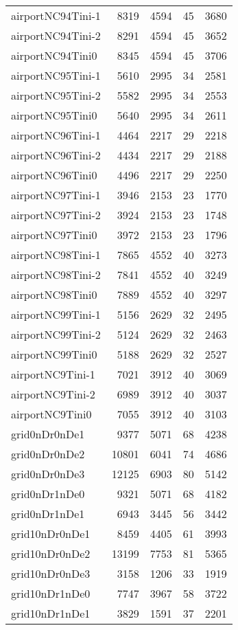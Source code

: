 \begin{longtable}{lrrrr}
airportNC94Tini-1 & 8319 & 4594 & 45 & 3680 \\
airportNC94Tini-2 & 8291 & 4594 & 45 & 3652 \\
airportNC94Tini0 & 8345 & 4594 & 45 & 3706 \\
airportNC95Tini-1 & 5610 & 2995 & 34 & 2581 \\
airportNC95Tini-2 & 5582 & 2995 & 34 & 2553 \\
airportNC95Tini0 & 5640 & 2995 & 34 & 2611 \\
airportNC96Tini-1 & 4464 & 2217 & 29 & 2218 \\
airportNC96Tini-2 & 4434 & 2217 & 29 & 2188 \\
airportNC96Tini0 & 4496 & 2217 & 29 & 2250 \\
airportNC97Tini-1 & 3946 & 2153 & 23 & 1770 \\
airportNC97Tini-2 & 3924 & 2153 & 23 & 1748 \\
airportNC97Tini0 & 3972 & 2153 & 23 & 1796 \\
airportNC98Tini-1 & 7865 & 4552 & 40 & 3273 \\
airportNC98Tini-2 & 7841 & 4552 & 40 & 3249 \\
airportNC98Tini0 & 7889 & 4552 & 40 & 3297 \\
airportNC99Tini-1 & 5156 & 2629 & 32 & 2495 \\
airportNC99Tini-2 & 5124 & 2629 & 32 & 2463 \\
airportNC99Tini0 & 5188 & 2629 & 32 & 2527 \\
airportNC9Tini-1 & 7021 & 3912 & 40 & 3069 \\
airportNC9Tini-2 & 6989 & 3912 & 40 & 3037 \\
airportNC9Tini0 & 7055 & 3912 & 40 & 3103 \\
grid0nDr0nDe1 & 9377 & 5071 & 68 & 4238 \\
grid0nDr0nDe2 & 10801 & 6041 & 74 & 4686 \\
grid0nDr0nDe3 & 12125 & 6903 & 80 & 5142 \\
grid0nDr1nDe0 & 9321 & 5071 & 68 & 4182 \\
grid0nDr1nDe1 & 6943 & 3445 & 56 & 3442 \\
grid10nDr0nDe1 & 8459 & 4405 & 61 & 3993 \\
grid10nDr0nDe2 & 13199 & 7753 & 81 & 5365 \\
grid10nDr0nDe3 & 3158 & 1206 & 33 & 1919 \\
grid10nDr1nDe0 & 7747 & 3967 & 58 & 3722 \\
grid10nDr1nDe1 & 3829 & 1591 & 37 & 2201 \\

\end{longtable}
